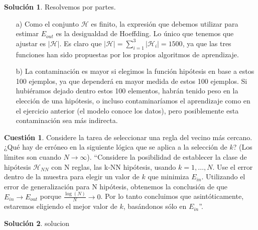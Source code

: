 \documentclass[a4paper, 11pt]{article}
\theoremstyle{definition}
\newtheorem{cuestion}{Cuestión}
\newtheorem*{solucion}{Solución}
\begin{document}
  \begin{solucion}
    Resolvemos por partes.
    \begin{enumerate}
      \item[a)] Como el conjunto $\mathcal{H}$ es finito, la expresión que debemos utilizar para estimar $E_{out}$ es la desigualdad de Hoeffding. Lo único que tenemos que ajustar es $|\mathcal{H}|$. Es claro que $|\mathcal{H}| = \sum_{i=1}^3 |\mathcal{H}_i| = 1500$, ya que las tres funciones han sido propuestas por los propios algoritmos de aprendizaje.
      \item[b)] La contaminación es mayor si elegimos la función hipótesis en base a estos 100 ejemplos, ya que dependerá en mayor medida de estos 100 ejemplos. Si hubiéramos dejado dentro estos 100 elementos, habrán tenido peso en la elección de una hipótesis, o incluso contaminaríamos el aprendizaje como en el ejercicio anterior (el modelo conoce los datos), pero posiblemente esta contaminación sea más indirecta.
    \end{enumerate}


  \end{solucion}

  \begin{cuestion}
    Considere la tarea de seleccionar una regla del vecino más cercano. ¿Qué hay de erróneo en la siguiente lógica que se aplica a la selección de $k$? (Los límites son cuando $N \rightarrow \infty$). ``Considere la posibilidad de establecer la clase de hipótesis $\mathcal{H}_{NN}$ con N reglas, las k-NN hipótesis, usando $k=1,\ldots,N$. Use el error dentro de la muestra para elegir un valor de $k$ que minimiza $E_{in}$. Utilizando el error de generalización para N hipótesis, obtenemos la conclusión de que $E_{in} \rightarrow E_{out}$ porque $\frac{\log(N)}{N} \rightarrow 0$. Por lo tanto concluimos que asintóticamente, estaremos eligiendo el mejor valor de $k$, basándonos sólo en $E_{in}$''.
  \end{cuestion}

  \begin{solucion}
    solucion
  \end{solucion}
\end{document}
